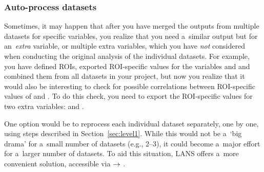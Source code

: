 







\subsubsection{Auto-process datasets}
\setcounter{step}{0}

\goldbox{}
Sometimes, it may happen that after you have merged the outputs from multiple datasets for specific variables, you realize that you need a~similar output but for an~\emph{extra} variable, or multiple extra variables, which you have \emph{not} considered when conducting the original analysis of the individual datasets. For example, you have defined ROIs, exported ROI-specific values for the variables  and  and combined them from all datasets in your project, but now you realize that it would also be interesting to check for possible correlations between ROI-specific values of  and . To do this check, you need to export the ROI-specific values for two extra variables:  and . 
\tcbe

One option would be to reprocess each individual dataset separately, one by one, using steps described in Section~\ref{sec:level1}. While this would not be a~`big drama' for a~small number of datasets (e.g., 2--3), it could become a~major effort for a~larger number of datasets. To aid this situation, LANS offers a~more convenient solution, accessible via  $\rightarrow$ .

